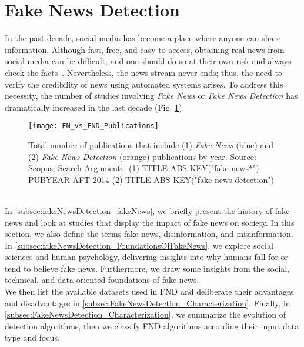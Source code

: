 \section{Fake News Detection}
\label{sec:fakeNewsDetection}
In the past decade, social media has become a place where anyone can share information. Although fast, free, and easy to access, obtaining real news from social media can be difficult, and one should do so at their own risk and always check the facts~\parencite{SocialMediaAndFakeNewsIn2016Election_Allcott,TheScienceOfFakeNews_Lazer}. Nevertheless, the news stream never ends; thus, the need to verify the credibility of news using automated systems arises. To address this necessity, the number of studies involving \emph{Fake News} or \emph{Fake News Detection} has dramatically increased in the last decade (Fig. \ref{fig:FN_vs_FND_Publications}).
\begin{figure}
    \centering
    \texttt{[image: FN\_vs\_FND\_Publications]}
    \caption[Fake News and Fake News Detection Publications by Year]{Total number of publications that include (1) \emph{Fake News} (blue) and (2) \emph{Fake News Detection} (orange) publications by year. Source: Scopus; Search Arguments: (1) TITLE-ABS-KEY("fake news*") PUBYEAR AFT 2014 (2) TITLE-ABS-KEY("fake news detection")}\label{fig:FN_vs_FND_Publications}
\end{figure}\\
In \ref{subsec:fakeNewsDetection_fakeNews}, we briefly present the history of fake news and look at studies that display the impact of fake news on society. In this section, we also define the terms fake news, disinformation, and misinformation. \\
In \ref{subsec:fakeNewsDetection_FoundationsOfFakeNews}, we explore social sciences and human psychology, delivering insights into why humans fall for or tend to believe fake news. Furthermore, we draw some insights from the social, technical, and data-oriented foundations of fake news.\\
We then list the available datasets used in FND and deliberate their advantages and disadvantages in \ref{subsec:FakeNewsDetection_Characterization}. Finally, in \ref{subsec:FakeNewsDetection_Characterization}, we summarize the evolution of detection algorithms, then we classify FND algorithms according their input data type and focus.

